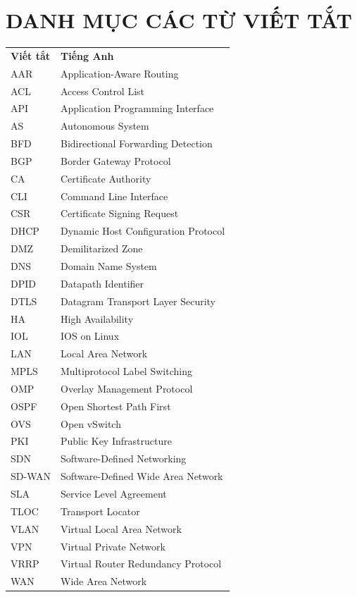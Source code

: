 \newpage
\section*{DANH MỤC CÁC TỪ VIẾT TẮT}

{
\renewcommand{\arraystretch}{1.3}
\begin{longtable}{ >{\centering\arraybackslash}p{3cm} p{9cm} }
    \textbf{Viết tắt} & \textbf{Tiếng Anh} \\

    AAR & Application-Aware Routing \\
    ACL & Access Control List \\
    API & Application Programming Interface \\
    AS & Autonomous System \\
    BFD & Bidirectional Forwarding Detection \\
    BGP & Border Gateway Protocol \\
    CA & Certificate Authority \\
    CLI & Command Line Interface \\
    CSR & Certificate Signing Request \\
    DHCP & Dynamic Host Configuration Protocol \\
    DMZ & Demilitarized Zone \\
    DNS & Domain Name System \\
    DPID & Datapath Identifier \\
    DTLS & Datagram Transport Layer Security \\
    HA & High Availability \\
    IOL & IOS on Linux \\
    LAN & Local Area Network \\
    MPLS & Multiprotocol Label Switching \\
    OMP & Overlay Management Protocol \\
    OSPF & Open Shortest Path First \\
    OVS & Open vSwitch \\
    PKI & Public Key Infrastructure \\
    SDN & Software-Defined Networking \\
    SD-WAN & Software-Defined Wide Area Network \\
    SLA & Service Level Agreement \\
    TLOC & Transport Locator \\
    VLAN & Virtual Local Area Network \\
    VPN & Virtual Private Network \\
    VRRP & Virtual Router Redundancy Protocol \\
    WAN & Wide Area Network \\
\end{longtable}
}
